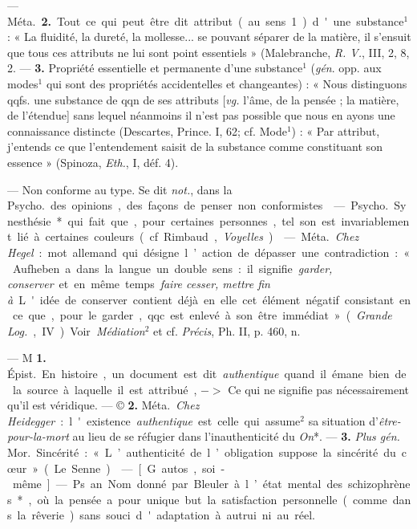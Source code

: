 \begin{itemize}[leftmargin=1cm, label=, itemsep=1pt]
{{— \si{Méta.} {\bf 2.} Tout ce qui peut être
dit attribut (au sens 1) d'une substance$^1$ : « La fluidité, la dureté, la
mollesse... se pouvant séparer de la
matière, il s'ensuit que tous ces
attributs ne lui sont point essentiels » (Malebranche, {\it R. V.}, III, 2,
8, 2}. — {\bf 3.} Propriété essentielle et
permanente d’une substance$^1$ ({\it gén}.
opp. aux modes$^1$ qui sont des propriétés accidentelles et changeantes) :
« Nous distinguons qqfs. une substance de qqn de ses attributs [{\it vg.}
l'âme, de la pensée ; la matière, de
l'étendue] sans lequel néanmoins il
n’est pas possible que nous en ayons
une connaissance distincte (Descartes, Prince. I, 62; cf. Mode$^1$) :
« Par attribut, j'entends ce que
l’entendement saisit de la substance
comme constituant son essence »
(Spinoza, {\it Eth.}, I, déf. 4).

 — Non conforme au type.
Se dit {\it not.}, dans la \si{Psycho.} des opinions, des façons de penser non
conformistes.

 — \si{Psycho.} Synesthésie* qui fait que, pour certaines
personnes, tel son est invariablement lié à certaines couleurs (cf.
Rimbaud, {\it Voyelles}).

 — \si{Méta.} {\it Chez Hegel} : mot
allemand qui désigne l’action de
dépasser une contradiction : « Aufheben a dans la langue un double
sens : il signifie {\it garder, conserver} et
en même temps {\it faire cesser, mettre
fin à}. L'idée de conserver contient
déjà en elle cet élément négatif
consistant en ce que, pour le garder,
qqc est enlevé à son être immédiat »
({\it Grande \si{Log.}}, IV). Voir {\it Médiation}$^2$
et cf. {\it Précis}, Ph. II, p. 460, n.

 — M {\bf 1.} \si{Épist.}
En histoire, un document est dit
{\it authentique} quand il émane bien de
la source à laquelle il est attribué,
$->$ Ce qui ne signifie pas nécessairement qu'il est véridique. — © {\bf 2.}
\si{Méta.} {\it Chez Heidegger} : l'existence
{\it authentique} est celle qui assume$^2$
sa situation d'{\it être-pour-la-mort} au
lieu de se réfugier dans l’inauthenticité du {\it On}*. — {\bf 3.} {\it Plus gén.} \si{Mor.}
Sincérité : « L’authenticité de l’obligation suppose la sincérité du cœur »
(Le Senne).

 — [G. autos, soi-même] — Ps.
an. Nom donné par Bleuler à l’état
mental des schizophrènes*, où la
pensée a pour unique but la satisfaction personnelle (comme dans la
rêverie) sans souci d'adaptation à
autrui ni au réel.

}
\end{itemize}
